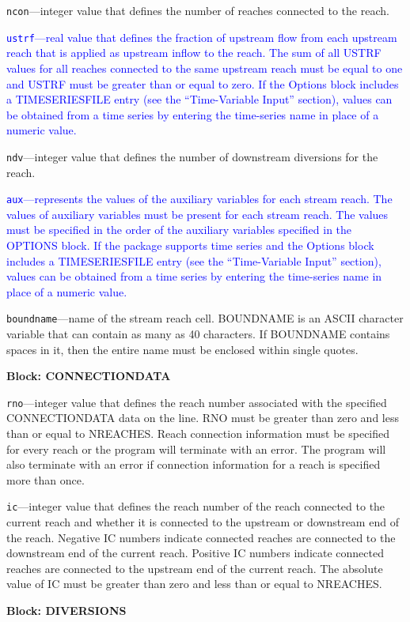 \begin{description}
\item \texttt{ncon}---integer value that defines the number of reaches connected to the reach.

\item \textcolor{blue}{\texttt{ustrf}---real value that defines the fraction of upstream flow from each upstream reach that is applied as upstream inflow to the reach. The sum of all USTRF values for all reaches connected to the same upstream reach must be equal to one and USTRF must be greater than or equal to zero. If the Options block includes a TIMESERIESFILE entry (see the ``Time-Variable Input'' section), values can be obtained from a time series by entering the time-series name in place of a numeric value.}

\item \texttt{ndv}---integer value that defines the number of downstream diversions for the reach.

\item \textcolor{blue}{\texttt{aux}---represents the values of the auxiliary variables for each stream reach. The values of auxiliary variables must be present for each stream reach. The values must be specified in the order of the auxiliary variables specified in the OPTIONS block.  If the package supports time series and the Options block includes a TIMESERIESFILE entry (see the ``Time-Variable Input'' section), values can be obtained from a time series by entering the time-series name in place of a numeric value.}

\item \texttt{boundname}---name of the stream reach cell.  BOUNDNAME is an ASCII character variable that can contain as many as 40 characters.  If BOUNDNAME contains spaces in it, then the entire name must be enclosed within single quotes.

\end{description}
\item \textbf{Block: CONNECTIONDATA}

\begin{description}
\item \texttt{rno}---integer value that defines the reach number associated with the specified CONNECTIONDATA data on the line. RNO must be greater than zero and less than or equal to NREACHES. Reach connection information must be specified for every reach or the program will terminate with an error.  The program will also terminate with an error if connection information for a reach is specified more than once.

\item \texttt{ic}---integer value that defines the reach number of the reach connected to the current reach and whether it is connected to the upstream or downstream end of the reach. Negative IC numbers indicate connected reaches are connected to the downstream end of the current reach. Positive IC numbers indicate connected reaches are connected to the upstream end of the current reach. The absolute value of IC must be greater than zero and less than or equal to NREACHES.

\end{description}
\item \textbf{Block: DIVERSIONS}

